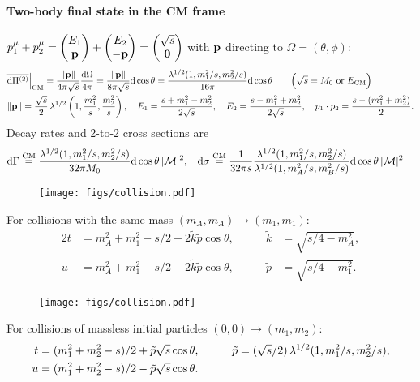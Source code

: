 \documentclass[CheatSheet]{subfiles}
\begin{document}
\paragraph{Two-body final state in the CM frame}
$\displaystyle p_1^\mu+p_2^\mu=\begin{pmatrix}E_1\\{\mathbf{p}}\end{pmatrix}+\begin{pmatrix}E_2\\-{\mathbf{p}}\end{pmatrix}=\begin{pmatrix}\sqrt s\\{\mathbf{0}}\end{pmatrix}$
with ${\mathbf{p}}$ directing to $\Omega=(\theta,\phi)$:
\begin{align}
&\overline{\dd\Pi^{(2)}}\Big|\w{CM}
=\frac{\|\vc p\|}{4\pi\sqrt{s}}\frac{\dd\Omega}{4\pi}
=
\frac{\|\vc p\|}{8\pi \sqrt{s}}\dd\cos\theta
=
\frac{\Kallen[1/2](1,m_1^2/s,m_2^2/s)}{16\pi}\dd\cos\theta
\qquad \Bigl(\text{$\sqrt s = M_0$ or $E\w{CM}$}\Bigr)
\\
\notag&
\|\vc p\|=\frac{\sqrt{s}}{2}\Kallen[1/2]\left(1,\frac{m_1^2}{s},\frac{m_2^2}{s}\right),\quad
 E_1=\frac{s+m_1^2-m_2^2}{2\sqrt{s}},\quad
 E_2=\frac{s-m_1^2+m_2^2}{2\sqrt{s}},\quad
 p_1\cdot p_2 = \frac{s-(m_1^2+m_2^2)}{2}.
\end{align}
Decay rates and 2-to-2 cross sections are
\begin{align}
\dd\Gamma
&\stackrel{\text{CM}}{=}
\frac{\Kallen[1/2](1,m_1^2/s,m_2^2/s)}{32\pi M_0}
  \dd\cos\theta\,|\mathcal M|^2,
&
\dd\sigma
&\stackrel{\text{CM}}{=}
\frac{1}{32\pi s}
  \frac{\Kallen[1/2](1,m_1^2/s,m_2^2/s)}{\Kallen[1/2](1,m_A^2/s,m_B^2/s)}
  \dd\cos\theta\,|\mathcal M|^2
\end{align}


\begin{wrapfigure}[2]{r}{12em}\vspace{-1.5em}
 \texttt{[image: figs/collision.pdf]}
\end{wrapfigure}

\noindent
For collisions with the same mass $(m_A,m_A)\to (m_1,m_1)$:
\begin{alignat*}{2}
t &= m_A^2+m_1^2 - s/2+2\tilde k\tilde p\cos\theta,\qquad
&\tilde k&={\sqrt{s/4-m_A^2}},\\
u &= m_A^2+m_1^2 - s/2-2\tilde k\tilde p\cos\theta,
&\tilde p&={\sqrt{s/4-m_1^2}}.
\end{alignat*}

\begin{wrapfigure}[2]{r}{12em}\vspace{-2em}
 \texttt{[image: figs/collision.pdf]}
\end{wrapfigure}

\noindent
For collisions of massless initial particles $(0,0)\to (m_1,m_2)$:
\begin{alignat*}{2}
 t &= (m_1^2+m_2^2-s)/2+\tilde p\sqrt{s}\cos\theta,\qquad
&\tilde p&=(\sqrt{s}/2)\Kallen[1/2](1,m_1^2/s,m_2^2/s),\\
 u &= (m_1^2+m_2^2-s)/2-\tilde p\sqrt{s}\cos\theta.
\end{alignat*}
\end{document}

